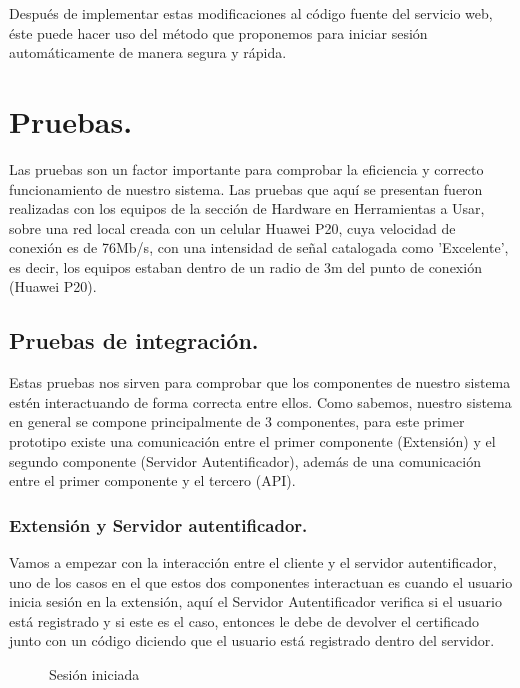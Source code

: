 \documentclass[12pt, a4paper, titlepage]{report}
\begin{document}
	
	                Después de implementar estas modificaciones al código fuente del servicio web, éste puede hacer uso del método que proponemos para iniciar sesión automáticamente de manera segura y rápida.
	\chapter{\textcolor{azulescom}{Pruebas.}}
	
	    Las pruebas son un factor importante para comprobar la eficiencia y correcto funcionamiento de nuestro sistema. Las pruebas que aquí se presentan fueron realizadas con los equipos de la sección de Hardware en Herramientas a Usar, sobre una red local creada con un celular Huawei P20, cuya velocidad de conexión es de 76Mb/s, con una intensidad de señal catalogada como 'Excelente', es decir, los equipos estaban dentro de un radio de 3m del punto de conexión (Huawei P20).
        
	    \section{Pruebas de integración.}
    	    Estas pruebas nos sirven para comprobar que los componentes de nuestro sistema estén interactuando de forma correcta entre ellos. Como sabemos, nuestro sistema en general se compone principalmente de 3 componentes, para este primer prototipo existe una comunicación entre el primer componente (Extensión) y el segundo componente (Servidor Autentificador), además de una comunicación entre el primer componente y el tercero (API).\\
    	    
    	    \subsection{Extensión y Servidor autentificador.}
    	    Vamos a empezar con la interacción entre el cliente y el servidor autentificador, uno de los casos en el que estos dos componentes interactuan es cuando el usuario inicia sesión en la extensión, aquí el Servidor Autentificador verifica si el usuario está registrado y si este es el caso, entonces le debe de devolver el certificado junto con un código diciendo que el usuario está registrado dentro del servidor.
    	    
    	    \begin{figure}[H]
    	        \centering
    	        \caption{Sesión iniciada}
    	        \label{fig:sesionIniciada}
    	    \end{figure}
	    
\end{document}
